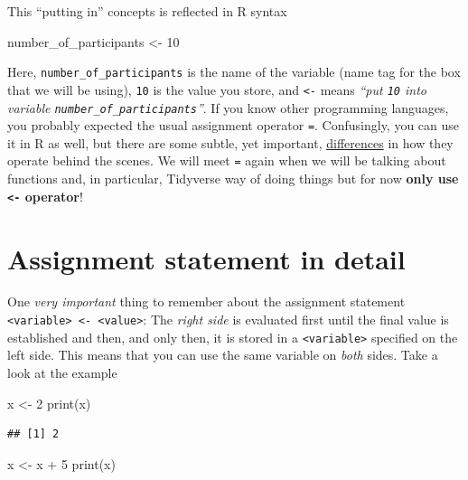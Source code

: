 \documentclass[
]{book}
\newenvironment{Shaded}{\begin{snugshade}}{\end{snugshade}}
\newcommand{\DecValTok}[1]{\textcolor[rgb]{0.00,0.00,0.81}{#1}}
\newcommand{\FunctionTok}[1]{\textcolor[rgb]{0.00,0.00,0.00}{#1}}
\newcommand{\NormalTok}[1]{#1}
\newcommand{\OtherTok}[1]{\textcolor[rgb]{0.56,0.35,0.01}{#1}}
\newcommand{\SpecialCharTok}[1]{\textcolor[rgb]{0.00,0.00,0.00}{#1}}
\begin{document}
This ``putting in'' concepts is reflected in R syntax

\begin{Shaded}
\begin{Highlighting}[]
\NormalTok{number\_of\_participants }\OtherTok{\textless{}{-}} \DecValTok{10}
\end{Highlighting}
\end{Shaded}

Here, \texttt{number\_of\_participants} is the name of the variable (name tag for the box that we will be using), \texttt{10} is the value you store, and \texttt{\textless{}-} means \emph{``put \texttt{10} into variable \texttt{number\_of\_participants}''}. If you know other programming languages, you probably expected the usual assignment operator \texttt{=}. Confusingly, you can use it in R as well, but there are some subtle, yet important, \href{https://stat.ethz.ch/R-manual/R-devel/library/base/html/assignOps.html}{differences} in how they operate behind the scenes. We will meet \texttt{=} again when we will be talking about functions and, in particular, Tidyverse way of doing things but for now \textbf{only use \texttt{\textless{}-} operator}!

\hypertarget{assignment-statement}{%
\section{Assignment statement in detail}\label{assignment-statement}}

One \emph{very important} thing to remember about the assignment statement \texttt{\textless{}variable\textgreater{}\ \textless{}-\ \textless{}value\textgreater{}}: The \emph{right side} is evaluated first until the final value is established and then, and only then, it is stored in a \texttt{\textless{}variable\textgreater{}} specified on the left side. This means that you can use the same variable on \emph{both} sides. Take a look at the example

\begin{Shaded}
\begin{Highlighting}[]
\NormalTok{x }\OtherTok{\textless{}{-}} \DecValTok{2}
\FunctionTok{print}\NormalTok{(x)}
\end{Highlighting}
\end{Shaded}

\begin{verbatim}
## [1] 2
\end{verbatim}

\begin{Shaded}
\begin{Highlighting}[]
\NormalTok{x }\OtherTok{\textless{}{-}}\NormalTok{ x }\SpecialCharTok{+} \DecValTok{5}
\FunctionTok{print}\NormalTok{(x)}
\end{Highlighting}
\end{Shaded}
\end{document}

